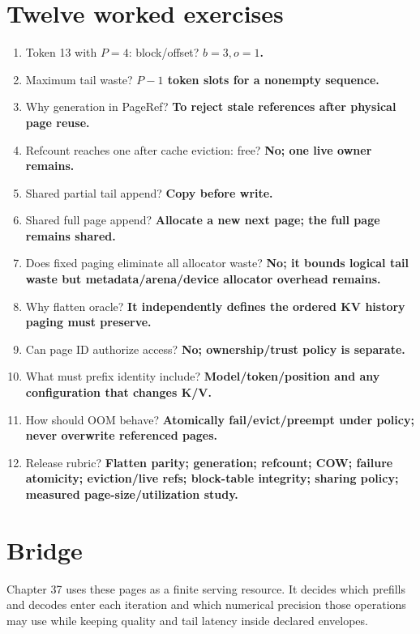 \section{Twelve worked exercises}
\begin{enumerate}
\item Token 13 with $P=4$: block/offset? \textbf{$b=3,o=1$.}
\item Maximum tail waste? \textbf{$P-1$ token slots for a nonempty sequence.}
\item Why generation in PageRef? \textbf{To reject stale references after physical page reuse.}
\item Refcount reaches one after cache eviction: free? \textbf{No; one live owner remains.}
\item Shared partial tail append? \textbf{Copy before write.}
\item Shared full page append? \textbf{Allocate a new next page; the full page remains shared.}
\item Does fixed paging eliminate all allocator waste? \textbf{No; it bounds logical tail waste but metadata/arena/device allocator overhead remains.}
\item Why flatten oracle? \textbf{It independently defines the ordered KV history paging must preserve.}
\item Can page ID authorize access? \textbf{No; ownership/trust policy is separate.}
\item What must prefix identity include? \textbf{Model/token/position and any configuration that changes K/V.}
\item How should OOM behave? \textbf{Atomically fail/evict/preempt under policy; never overwrite referenced pages.}
\item Release rubric? \textbf{Flatten parity; generation; refcount; COW; failure atomicity; eviction/live refs; block-table integrity; sharing policy; measured page-size/utilization study.}
\end{enumerate}

\section{Bridge}
Chapter 37 uses these pages as a finite serving resource. It decides which prefills and decodes enter each iteration and which numerical precision those operations may use while keeping quality and tail latency inside declared envelopes.
